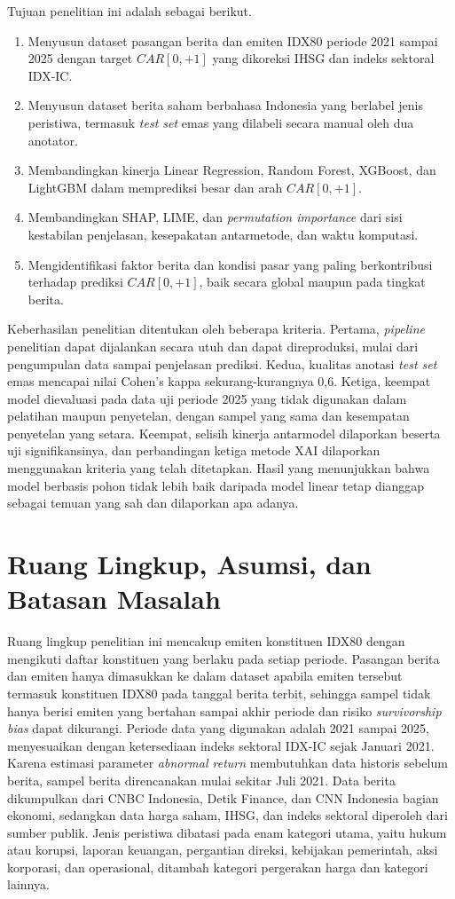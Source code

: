 Tujuan penelitian ini adalah sebagai berikut.
\begin{enumerate}
    \item Menyusun dataset pasangan berita dan emiten IDX80 periode 2021 sampai 2025 dengan target $CAR[0,+1]$ yang dikoreksi IHSG dan indeks sektoral IDX-IC.
    \item Menyusun dataset berita saham berbahasa Indonesia yang berlabel jenis peristiwa, termasuk \emph{test set} emas yang dilabeli secara manual oleh dua anotator.
    \item Membandingkan kinerja Linear Regression, Random Forest, XGBoost, dan LightGBM dalam memprediksi besar dan arah $CAR[0,+1]$.
    \item Membandingkan SHAP, LIME, dan \emph{permutation importance} dari sisi kestabilan penjelasan, kesepakatan antarmetode, dan waktu komputasi.
    \item Mengidentifikasi faktor berita dan kondisi pasar yang paling berkontribusi terhadap prediksi $CAR[0,+1]$, baik secara global maupun pada tingkat berita.
\end{enumerate}

Keberhasilan penelitian ditentukan oleh beberapa kriteria. Pertama, \emph{pipeline} penelitian dapat dijalankan secara utuh dan dapat direproduksi, mulai dari pengumpulan data sampai penjelasan prediksi. Kedua, kualitas anotasi \emph{test set} emas mencapai nilai Cohen's kappa sekurang-kurangnya 0,6. Ketiga, keempat model dievaluasi pada data uji periode 2025 yang tidak digunakan dalam pelatihan maupun penyetelan, dengan sampel yang sama dan kesempatan penyetelan yang setara. Keempat, selisih kinerja antarmodel dilaporkan beserta uji signifikansinya, dan perbandingan ketiga metode XAI dilaporkan menggunakan kriteria yang telah ditetapkan. Hasil yang menunjukkan bahwa model berbasis pohon tidak lebih baik daripada model linear tetap dianggap sebagai temuan yang sah dan dilaporkan apa adanya.

\section{Ruang Lingkup, Asumsi, dan Batasan Masalah}

Ruang lingkup penelitian ini mencakup emiten konstituen IDX80 dengan mengikuti daftar konstituen yang berlaku pada setiap periode. Pasangan berita dan emiten hanya dimasukkan ke dalam dataset apabila emiten tersebut termasuk konstituen IDX80 pada tanggal berita terbit, sehingga sampel tidak hanya berisi emiten yang bertahan sampai akhir periode dan risiko \emph{survivorship bias} dapat dikurangi. Periode data yang digunakan adalah 2021 sampai 2025, menyesuaikan dengan ketersediaan indeks sektoral IDX-IC sejak Januari 2021. Karena estimasi parameter \emph{abnormal return} membutuhkan data historis sebelum berita, sampel berita direncanakan mulai sekitar Juli 2021. Data berita dikumpulkan dari CNBC Indonesia, Detik Finance, dan CNN Indonesia bagian ekonomi, sedangkan data harga saham, IHSG, dan indeks sektoral diperoleh dari sumber publik. Jenis peristiwa dibatasi pada enam kategori utama, yaitu hukum atau korupsi, laporan keuangan, pergantian direksi, kebijakan pemerintah, aksi korporasi, dan operasional, ditambah kategori pergerakan harga dan kategori lainnya.

